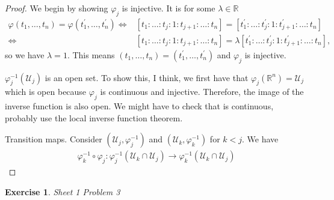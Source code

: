 \documentclass{book}
\theoremstyle{custom_definition}
\newtheorem{exercise}{Exercise}
\theoremstyle{custom_theorem}
\begin{document}
    \begin{proof}
        We begin by showing \(\varphi_j\) is injective. It is for some \(\lambda \in \mathbb{R}\)
        \begin{align}
            \varphi(t_1, \ldots, t_n) = \varphi(t_1^\prime, \ldots, t_n^\prime) \iff & [t_1 : \ldots : t_j : 1 : t_{j+1} : \ldots : t_n] = [t_1^\prime : \ldots : t_j^\prime : 1 : t_{j+1}^\prime : \ldots : t_n] \\
            \iff & [t_1 : \ldots : t_j : 1 : t_{j+1} : \ldots : t_n] = \lambda [t_1^\prime : \ldots : t_j^\prime : 1 : t_{j+1}^\prime : \ldots : t_n] \text{,}
        \end{align}
        so we have \(\lambda = 1\). This means \((t_1, \ldots, t_n) = (t_1^\prime, \ldots, t_n^\prime)\) and \(\varphi_j\) is injective.

        \(\varphi_j^{-1}(\mathcal{U}_j)\) is an open set. To show this, I think, we first have that \(\varphi_j(\mathbb{R}^n) = \mathcal{U}_j\) which is open because \(\varphi_j\) is continuous and injective. Therefore, the image of the inverse function is also open. We might have to check that is continuous, probably use the local inverse function theorem.

        Transition maps. Consider \((\mathcal{U}_j, \varphi_j^{-1})\) and \((\mathcal{U}_k, \varphi_k^{-1})\) for \(k < j\). We have
        \begin{align}
            \varphi_k^{-1} \circ \varphi_j : \varphi_j^{-1}(\mathcal{U}_k \cap \mathcal{U}_j) \longrightarrow \varphi_k^{-1} (\mathcal{U}_k \cap \mathcal{U}_j)
        \end{align}
    \end{proof}
    \begin{exercise}
        Sheet 1 Problem 3
    \end{exercise}
\end{document}
